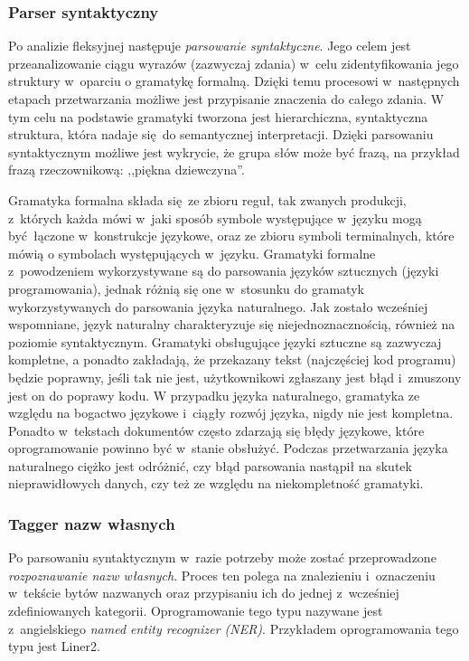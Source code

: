\documentclass[a4paper, twoside, openright, 12pt]{report}
\begin{document}
            \subsubsection{Parser syntaktyczny}
                Po analizie fleksyjnej następuje \emph{parsowanie syntaktyczne}. Jego celem jest przeanalizowanie ciągu wyrazów
                (zazwyczaj zdania) w~celu zidentyfikowania jego struktury w~oparciu o gramatykę formalną. Dzięki temu procesowi
                w~następnych etapach przetwarzania możliwe jest przypisanie znaczenia do całego zdania. W tym celu na podstawie
                gramatyki tworzona jest hierarchiczna, syntaktyczna struktura, która nadaje się do semantycznej interpretacji.
                Dzięki parsowaniu syntaktycznym możliwe jest wykrycie, że grupa słów może być frazą, na przykład frazą
                rzeczownikową: ,,piękna dziewczyna''.

                Gramatyka formalna składa się ze zbioru reguł, tak zwanych produkcji, z~których każda mówi w~jaki sposób symbole występujące
                w~języku mogą być łączone w~konstrukcje językowe, oraz ze zbioru symboli terminalnych, które mówią o symbolach występujących
                w~języku.
                Gramatyki formalne z~powodzeniem wykorzystywane są do parsowania języków sztucznych (języki programowania),
                jednak różnią się one w~stosunku do gramatyk wykorzystywanych do parsowania języka naturalnego. Jak zostało
                wcześniej wspomniane, język naturalny charakteryzuje się niejednoznacznością, również na poziomie syntaktycznym.
                Gramatyki obsługujące języki sztuczne są zazwyczaj kompletne, a ponadto zakładają, że przekazany tekst
                (najczęściej kod programu) będzie poprawny, jeśli tak nie jest, użytkownikowi zgłaszany jest błąd i~zmuszony
                jest on do poprawy kodu. W przypadku języka naturalnego, gramatyka ze względu na bogactwo językowe i~ciągły
                rozwój języka, nigdy nie jest kompletna. Ponadto w~tekstach dokumentów często zdarzają się błędy językowe,
                które oprogramowanie powinno być w~stanie obsłużyć. Podczas przetwarzania języka naturalnego ciężko jest odróżnić,
                czy błąd parsowania nastąpił na skutek nieprawidłowych danych, czy też ze względu na niekompletność gramatyki.

            \subsubsection{Tagger nazw własnych}
                Po parsowaniu syntaktycznym w~razie potrzeby może zostać przeprowadzone \emph{rozpoznawanie nazw własnych}. Proces
                ten polega na znalezieniu i~oznaczeniu w~tekście bytów nazwanych oraz przypisaniu ich do jednej z~wcześniej
                zdefiniowanych kategorii. Oprogramowanie tego typu nazywane jest z~angielskiego
                \emph{named entity recognizer (NER)}. Przykładem oprogramowania tego typu jest Liner2\cite{LINER2}.
\end{document}
